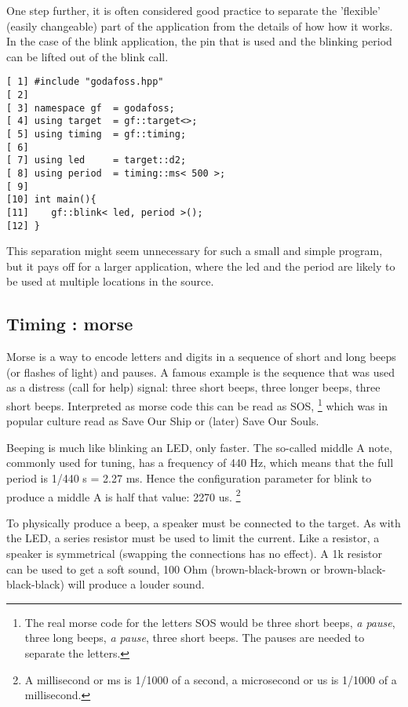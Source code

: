 \documentclass{article}
\begin{document}
One step further, it is often considered good practice to separate
the 'flexible' (easily changeable) part of the application from 
the details of how how it works.
In the case of the blink application, the pin that is used and the
blinking period can be lifted out of the blink call.

\lstset {language=C++}
\begin{lstlisting}
[ 1] #include "godafoss.hpp"
[ 2] 
[ 3] namespace gf  = godafoss;
[ 4] using target  = gf::target<>;
[ 5] using timing  = gf::timing;
[ 6] 
[ 7] using led     = target::d2;
[ 8] using period  = timing::ms< 500 >; 
[ 9] 
[10] int main(){
[11]    gf::blink< led, period >();
[12] }
\end{lstlisting}

This separation might seem unnecessary for such a small and simple
program, but it pays off for a larger application,
where the led and the period are likely to be used at
multiple locations in the source.

\subsection{Timing : morse}

Morse is a way to encode letters and digits in a sequence of 
short and long beeps (or flashes of light) and pauses. 
A famous example is the sequence that was used as a distress
(call for help) signal: three short beeps, three longer beeps, 
three short beeps. 
Interpreted as morse code this can be read as SOS,
\footnote{The real morse code for the letters SOS would be
three short beeps, \textit{a pause}, three long beeps, \textit{a pause},
three short beeps. The pauses are needed to separate the letters.}
which was in popular culture read as Save Our Ship or 
(later) Save Our Souls.

Beeping is much like blinking an LED, only faster.
The so-called middle A note, commonly used for tuning, has a frequency 
of 440 Hz, which means that the full period is 1/440 s = 2.27 ms.
Hence the configuration parameter for blink to produce a middle A
is half that value: 2270 us.
\footnote{A millisecond or ms is 1/1000 of a second, a microsecond or us 
is 1/1000 of a millisecond.}

To physically produce a beep, a speaker must be connected to the target.
As with the LED, a series resistor must be used to limit the current.
Like a resistor, a speaker is symmetrical 
(swapping the connections has no effect).
A 1k resistor can be used to get a soft sound, 100 Ohm 
(brown-black-brown or brown-black-black-black)
will produce a louder sound.
\end{document}
